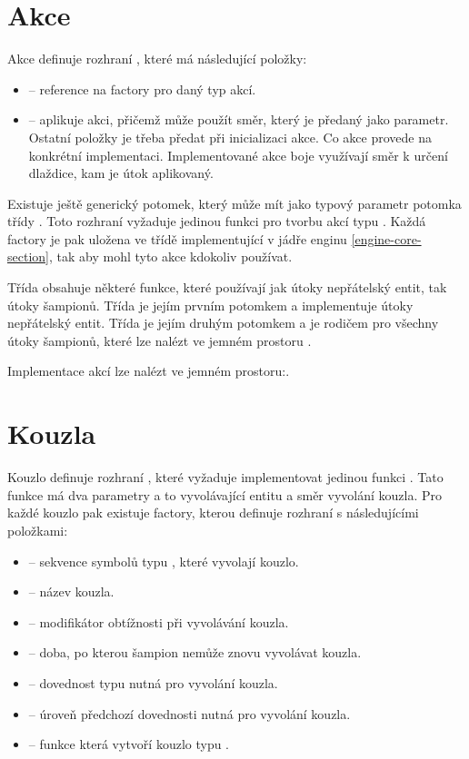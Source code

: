 \section{Akce}
Akce definuje rozhraní , které má následující položky:

\begin{itemize}
\item {} -- reference na factory pro daný typ akcí.
\item {} -- aplikuje akci, přičemž může použít směr, který je předaný jako parametr. Ostatní položky je třeba předat při inicializaci akce. 
	Co akce provede na konkrétní implementaci. Implementované akce boje využívají směr k určení dlaždice, kam je útok aplikovaný.
\end{itemize}

Existuje ještě generický potomek, který může mít jako typový parametr potomka třídy . Toto rozhraní vyžaduje jedinou funkci
 pro tvorbu akcí typu . Každá factory je pak uložena ve třídě implementující  v jádře
enginu \vref{engine-core-section}, tak aby mohl tyto akce kdokoliv používat. 

Třída  obsahuje některé funkce, které používají jak útoky nepřátelský entit, tak útoky šampionů.
Třída  je jejím prvním potomkem a implementuje útoky nepřátelský entit. Třída  
je jejím druhým potomkem a je rodičem pro všechny útoky šampionů, které lze nalézt ve jemném prostoru .

Implementace akcí lze nalézt ve jemném prostoru:\newline {}.

\section{Kouzla}
Kouzlo definuje rozhraní , které vyžaduje implementovat jedinou funkci . Tato funkce má dva parametry 
a to vyvolávající entitu a směr vyvolání kouzla. Pro každé kouzlo pak existuje factory, kterou definuje rozhraní  
s následujícími položkami:
\begin{itemize}  
\item {} -- sekvence symbolů typu , které vyvolají kouzlo.
\item {} -- název kouzla. 
\item {} -- modifikátor obtížnosti při vyvolávání kouzla. 
\item {} -- doba, po kterou šampion nemůže znovu vyvolávat kouzla.
\item {} -- dovednost typu  nutná pro vyvolání kouzla.
\item {} -- úroveň předchozí dovednosti nutná pro vyvolání kouzla.
\item {} -- funkce která vytvoří kouzlo typu .
\end{itemize}  

